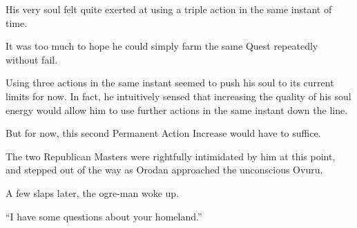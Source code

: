 \documentclass[a4paper,10pt]{book}
\begin{document}
His very soul felt quite exerted at using a triple action in the same instant of time.\par
It was too much to hope he could simply farm the same Quest repeatedly without fail.\par
Using three actions in the same instant seemed to push his soul to its current limits for now. In fact, he intuitively sensed that increasing the quality of his soul energy would allow him to use further actions in the same instant down the line.\par
But for now, this second Permanent Action Increase would have to suffice.\par
The two Republican Masters were rightfully intimidated by him at this point, and stepped out of the way as Orodan approached the unconscious Ovuru.\par
A few slaps later, the ogre-man woke up.\par
“I have some questions about your homeland.”\par
\end{document}
